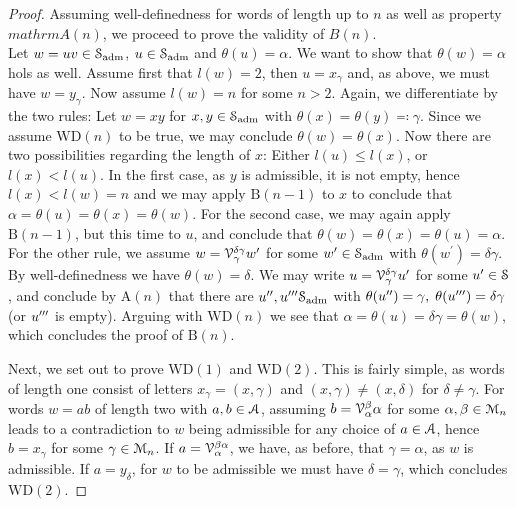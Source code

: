 \begin{lem}
\begin{proof}
Assuming well-definedness for words of length up to $n$ as well as property $mathrm{A}(n)$, we proceed to prove the validity of $B(n)$.\\
Let $w = uv \in \mathcal{S}_{\mathrm{adm}}$, $u \in \mathcal{S}_{\mathrm{adm}}$ and $\theta(u) = \alpha$. We want to show that $\theta(w) = \alpha$ hols as well. Assume first that $l(w) = 2$, then $u = x_\gamma$ and, as above, we must have $w = y_\gamma$. Now assume $l(w) = n$ for some $n > 2$. Again, we differentiate by the two rules: Let $w = xy$ for $x,y \in \mathcal{S}_\mathrm{adm}$ with $\theta(x) = \theta(y) \eqqcolon \gamma$. Since we assume $\mathrm{WD}(n)$ to be true, we may conclude $\theta(w) = \theta(x)$. Now there are two possibilities regarding the length of $x$: Either $l(u) \leq l(x)$, or $l(x) < l(u)$. In the first case, as $y$ is admissible, it is not empty, hence $l(x) < l(w) = n$ and we may apply $\mathrm{B}(n-1)$ to $x$ to conclude that $\alpha = \theta(u) = \theta(x) = \theta(w)$. For the second case, we may again apply $\mathrm{B}(n-1)$, but this time to $u$, and conclude that $\theta(w) = \theta(x) = \theta(u) = \alpha$. For the other rule, we assume $w = \mathcal{V}_\gamma^{\delta\gamma} w^\prime$ for some $w^\prime \in \mathcal{S}_{\mathrm{adm}}$ with $\theta(w^\prime) = \delta\gamma$. By well-definedness we have $\theta(w) = \delta$. We may write $u = \mathcal{V}_\gamma^{\delta\gamma} u^\prime$ for some $u^\prime \in \mathcal{S}$, and conclude by $\mathrm{A}(n)$ that there are $u^{{\prime\prime}},u^{{\prime\prime\prime}}\mathcal{S}_{\mathrm{adm}}$ with $\theta(u^{{\prime\prime}}) = \gamma, \; \theta(u^{{\prime\prime\prime}}) = \delta\gamma$ (or $u^{{\prime\prime\prime}}$ is empty). Arguing with $\mathrm{WD}(n)$ we see that $\alpha = \theta(u) = \delta\gamma = \theta(w)$, which concludes the proof of $\mathrm{B}(n)$.

Next, we set out to prove $\mathrm{WD}(1)$ and $\mathrm{WD}(2)$. This is fairly simple, as words of length one consist of letters $x_\gamma = (x,\gamma)$ and $(x,\gamma) \neq (x,\delta)$ for $\delta \neq \gamma$. For words $w = ab$ of length two with $a,b \in \mathcal{A}$, assuming $b=\mathcal{V}_\alpha^\beta\alpha$ for some $\alpha,\beta \in \mathcal{M}_n$ leads to a contradiction to $w$ being admissible for any choice of $a \in \mathcal{A}$, hence $b = x_\gamma$ for some $\gamma \in \mathcal{M}_n$. If $a = \mathcal{V}_\alpha^{\beta\alpha}$, we have, as before, that $\gamma = \alpha$, as $w$ is admissible. If $a = y_\delta$, for $w$ to be admissible we must have $\delta = \gamma$, which concludes $\mathrm{WD(2)}$.


\end{proof}
\end{lem}
